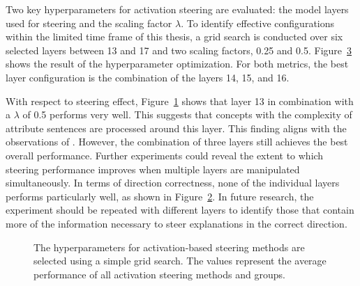 Two key hyperparameters for activation steering are evaluated: the model layers used for steering and the scaling factor \(\lambda\). To identify effective configurations within the limited time frame of this thesis, a grid search is conducted over six selected layers between \num{13} and \num{17} and two scaling factors, \num{0.25} and \num{0.5}. Figure~\ref{fig:activationSteeringHPO} shows the result of the hyperparameter optimization. For both metrics, the best layer configuration is the combination of the layers \num{14}, \num{15}, and \num{16}.

With respect to steering effect, Figure~\ref{fig:activationSteeringHPO:steeringEffect} shows that layer \num{13} in combination with a \(\lambda\) of \num{0.5} performs very well. This suggests that concepts with the complexity of attribute sentences are processed around this layer. This finding aligns with the observations of \citet{konenStyleVectorsSteering2024,bogdanEmergentEffectsScaling2025}. However, the combination of three layers still achieves the best overall performance. Further experiments could reveal the extent to which steering performance improves when multiple layers are manipulated simultaneously. In terms of direction correctness, none of the individual layers performs particularly well, as shown in Figure~\ref{fig:activationSteeringHPO:directionCorrectness}. In future research, the experiment should be repeated with different layers to identify those that contain more of the information necessary to steer explanations in the correct direction.

\begin{figure}[ht]
  \begin{subfigure}[t]{0.49\linewidth}
    \label{fig:activationSteeringHPO:steeringEffect}
  \end{subfigure}
  \hfill
  \begin{subfigure}[t]{0.49\linewidth}
    \label{fig:activationSteeringHPO:directionCorrectness}
  \end{subfigure}
  \caption{The hyperparameters for activation-based steering methods are selected using a simple grid search. The values represent the average performance of all activation steering methods and groups.}%
  \label{fig:activationSteeringHPO}
\end{figure}


